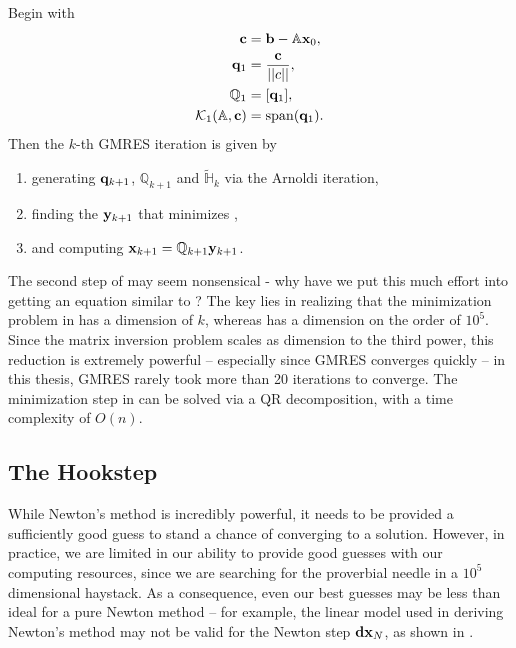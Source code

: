   \begin{algorithm}\label{alg:GMRES}
   Begin with
 \begin{align*}
 \mathbf{c} &= \mathbf{b} - \mathbb{A}\mathbf{x}_0,\\
  \mathbf{q}_1 &= \dfrac{\mathbf{c}}{||c||}, \\
  \mathbb{Q}_1 &= [\mathbf{q}_1],\\
  \mathcal{K}_1(\mathbb{A},\mathbf{c}) &= \mathrm{span}(\mathbf{q}_1).
  \end{align*}
  Then the $k$-th GMRES iteration is given by  
  \begin{enumerate}
  \item generating $\mathbf{q}_{k+1}$, $\mathbb{Q}_{k+1}$ and $\mathbb{\tilde{H}}_k$ via the Arnoldi iteration,
  \item finding the $\mathbf{y}_{k+1}$ that minimizes ,
  \item and computing $\mathbf{x}_{k+1} = \mathbb{Q}_{k+1}\mathbf{y}_{k+1}$.
  \end{enumerate}
  \end{algorithm}

 The second step of  may seem nonsensical - why have we put this much effort into getting an equation similar to ? The key lies in realizing that the minimization problem in   has a dimension of $k$, whereas  has a dimension on the order of $10^5$. Since the matrix inversion problem scales as dimension to the third power, this reduction is extremely powerful -- especially since GMRES converges quickly -- in this thesis, GMRES rarely took more than 20 iterations to converge. The minimization step in   can be solved via a QR decomposition, with a time complexity of $O(n)$.  
 
 \subsection{The Hookstep}
 
 While Newton's method is incredibly powerful, it needs to be provided a sufficiently good guess to stand a chance of converging to a solution. However, in practice, we are limited in our ability to provide good guesses with our computing resources, since we are searching for the proverbial needle in a $10^5$ dimensional haystack. As a consequence, even our best guesses may be less than ideal for a pure Newton method -- for example, the linear model used in deriving Newton's method may not be valid for the Newton step $\mathbf{dx}_N$, as shown in . 

